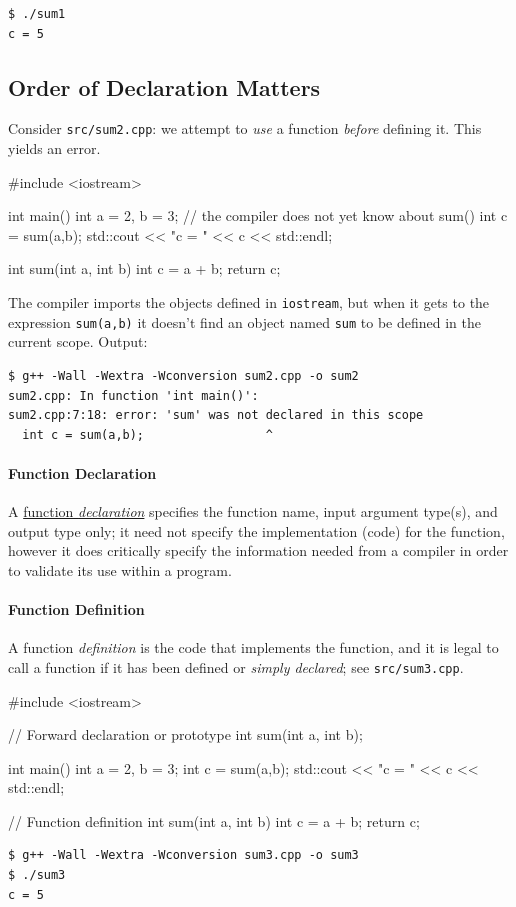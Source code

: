 \documentclass[12pt,letterpaper,twoside]{article}
\begin{document}
\begin{verbatim}
$ ./sum1
c = 5
\end{verbatim}

\subsection{Order of Declaration Matters}
Consider \texttt{src/sum2.cpp}: we attempt to \emph{use} a function \emph{before} defining it. This yields an error.

\begin{cpp}
#include <iostream>

int main() {
  int a = 2, b = 3;
  // the compiler does not yet know about sum()
  int c = sum(a,b);
  std::cout << "c = " << c << std::endl;
}

int sum(int a, int b) {
  int c = a + b;
  return c;
}
\end{cpp}

The compiler imports the objects defined in \texttt{iostream}, but when it gets
to the expression \texttt{sum(a,b)} it doesn't find an object named \texttt{sum} to be 
defined in the current scope.
Output:

{\small
\begin{verbatim}
$ g++ -Wall -Wextra -Wconversion sum2.cpp -o sum2
sum2.cpp: In function 'int main()':
sum2.cpp:7:18: error: 'sum' was not declared in this scope
  int c = sum(a,b);                 ^
\end{verbatim}
}
\paragraph{Function Declaration}
A \href{https://en.cppreference.com/w/cpp/language/function}{function \emph{declaration}} 
specifies the function name, input
argument type(s), and output type only; it 
need not specify the implementation (code) for the function, however it does
critically specify the information needed from a compiler in order to validate
its use within a program.

\paragraph{Function Definition}
A function \emph{definition} is the code that implements the function, and 
it is legal to call a function if it has been defined or
\emph{simply declared}; see \texttt{src/sum3.cpp}.

\begin{cpp}
#include <iostream>

// Forward declaration or prototype
int sum(int a, int b);

int main() {
  int a = 2, b = 3;
  int c = sum(a,b);
  std::cout << "c = " << c << std::endl;
}

// Function definition
int sum(int a, int b) {
  int c = a + b;
  return c;
}
\end{cpp}
{\small
\begin{verbatim}
$ g++ -Wall -Wextra -Wconversion sum3.cpp -o sum3
$ ./sum3
c = 5
\end{verbatim}
}
\end{document}
